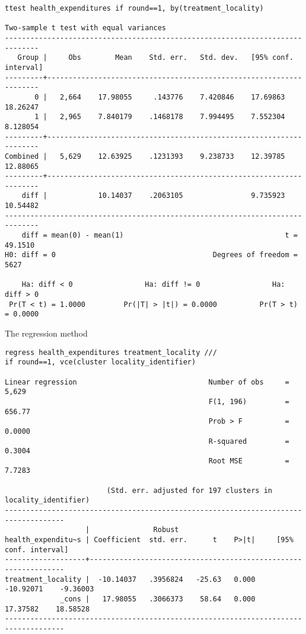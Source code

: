\documentclass[12pt]{article}
\begin{document}
\begin{verbatim}
ttest health_expenditures if round==1, by(treatment_locality)

Two-sample t test with equal variances
------------------------------------------------------------------------------
   Group |     Obs        Mean    Std. err.   Std. dev.   [95% conf. interval]
---------+--------------------------------------------------------------------
       0 |   2,664    17.98055     .143776    7.420846    17.69863    18.26247
       1 |   2,965    7.840179    .1468178    7.994495    7.552304    8.128054
---------+--------------------------------------------------------------------
Combined |   5,629    12.63925    .1231393    9.238733    12.39785    12.88065
---------+--------------------------------------------------------------------
    diff |            10.14037    .2063105                9.735923    10.54482
------------------------------------------------------------------------------
    diff = mean(0) - mean(1)                                      t =  49.1510
H0: diff = 0                                     Degrees of freedom =     5627

    Ha: diff < 0                 Ha: diff != 0                 Ha: diff > 0
 Pr(T < t) = 1.0000         Pr(|T| > |t|) = 0.0000          Pr(T > t) = 0.0000
\end{verbatim}

The regression method

\begin{verbatim}
regress health_expenditures treatment_locality ///
if round==1, vce(cluster locality_identifier)

Linear regression                               Number of obs     =      5,629
                                                F(1, 196)         =     656.77
                                                Prob > F          =     0.0000
                                                R-squared         =     0.3004
                                                Root MSE          =     7.7283

                        (Std. err. adjusted for 197 clusters in locality_identifier)
------------------------------------------------------------------------------------
                   |               Robust
health_expenditu~s | Coefficient  std. err.      t    P>|t|     [95% conf. interval]
-------------------+----------------------------------------------------------------
treatment_locality |  -10.14037   .3956824   -25.63   0.000    -10.92071    -9.36003
             _cons |   17.98055   .3066373    58.64   0.000     17.37582    18.58528
------------------------------------------------------------------------------------

\end{verbatim}
\end{document}

